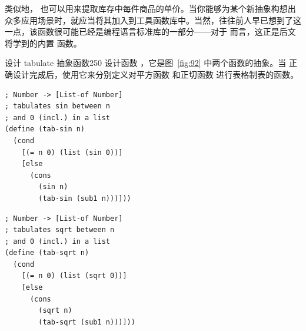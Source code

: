 类似地， 也可以用来提取库存中每件商品的单价。当你能够为某个新抽象构想出众多应用场景时，就应当将其加入到工具函数库中。当然，往往前人早已想到了这一点，该函数很可能已经是编程语言标准库的一部分——对于  而言，这正是后文将学到的内置  函数。

\begin{exercise}{设计 tabulate 抽象函数}{250}
设计函数 ，它是图~\ref{fig:92} 中两个函数的抽象。当  正确设计完成后，使用它来分别定义对平方函数  和正切函数  进行表格制表的函数。

\begin{center}
  \begin{stepperbox}[unbreakable]
    \noindent\begin{minipage}[t]{0.48\linewidth}\vspace{0pt}
\begin{Verbatim}[commandchars=\\\{\}, fontsize=\fontsize{6.0pt}{7.2pt}\selectfont]
; Number -> [List-of Number]
; tabulates sin between n
; and 0 (incl.) in a list
(define (tab-sin n)
  (cond
    [(= n 0) (list (sin 0))]
    [else
      (cons
        (sin n)
        (tab-sin (sub1 n)))]))
\end{Verbatim}
    \end{minipage}\hfill
    \begin{minipage}[t]{0.48\linewidth}\vspace{0pt}
\begin{Verbatim}[commandchars=\\\{\}, fontsize=\fontsize{6.0pt}{7.2pt}\selectfont]
; Number -> [List-of Number]
; tabulates sqrt between n
; and 0 (incl.) in a list
(define (tab-sqrt n)
  (cond
    [(= n 0) (list (sqrt 0))]
    [else
      (cons
        (sqrt n)
        (tab-sqrt (sub1 n)))]))
\end{Verbatim}
    \end{minipage}
  \end{stepperbox}
  \label{fig:92}
\end{center}
\end{exercise}

